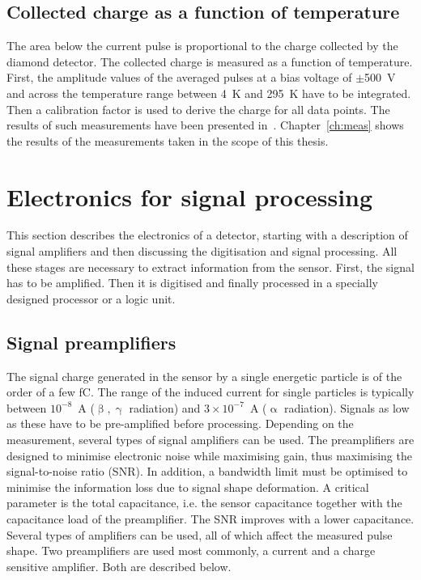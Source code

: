 \subsection{Collected charge as a function of temperature}
\label{subsec:qvst}
The area below the current pulse is proportional to the charge collected by the diamond detector. The collected charge is measured as a function of temperature. First, the amplitude values of the averaged pulses at a bias voltage of $\pm$500~V and across the temperature range between 4~K and 295~K have to be integrated. Then a calibration factor is used to derive the charge for all data points. The results of such measurements have been presented in~\cite{Jansen:1956431}. Chapter~\ref{ch:meas} shows the results of the measurements taken in the scope of this thesis.







\section{Electronics for signal processing} %
\label{sec:elecsigproc}
This section describes the electronics of a detector, starting with a description of signal amplifiers and then discussing the digitisation and signal processing. All these stages are necessary to extract information from the sensor. First, the signal has to be amplified. Then it is digitised and finally processed in a specially designed processor or a logic unit.

\subsection{Signal preamplifiers}
The signal charge generated in the sensor by a single energetic particle is of the order of a few fC. The range of the induced current for single particles is typically between $10^{-8}$~A ($\upbeta, \upgamma$ radiation) and $3\times10^{-7}$~A ($\upalpha$ radiation). Signals as low as these have to be pre-amplified before processing. Depending on the measurement, several types of signal amplifiers can be used. The preamplifiers are designed to minimise electronic noise while maximising gain, thus maximising the signal-to-noise ratio (SNR). In addition, a bandwidth limit must be optimised to minimise the information loss due to signal shape deformation. A critical parameter is the total capacitance, i.e. the sensor capacitance together with the capacitance load of the preamplifier. The SNR improves with a lower capacitance. Several types of amplifiers can be used, all of which affect the measured pulse shape. Two preamplifiers are used most commonly, a current and a charge sensitive amplifier. Both are described below. 

